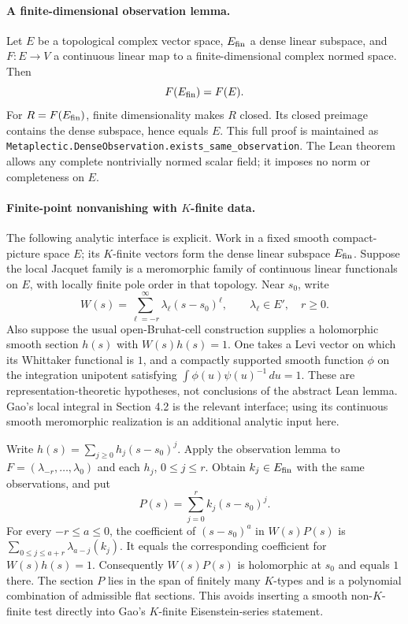 \paragraph{A finite-dimensional observation lemma.}
Let \(E\) be a topological complex vector space, \(E_{\rm fin}\)
a dense linear subspace, and \(F:E\to V\) a continuous linear map
to a finite-dimensional complex normed space. Then
\[
 F(E_{\rm fin})=F(E).
\]
For \(R=F(E_{\rm fin})\), finite dimensionality makes \(R\) closed.
Its closed preimage contains the dense subspace, hence equals \(E\).
This full proof is maintained as
\texttt{Metaplectic.DenseObservation.exists\_same\_observation}.
The Lean theorem allows any complete nontrivially normed scalar field;
it imposes no norm or completeness on \(E\).

\paragraph{Finite-point nonvanishing with \(K\)-finite data.}
The following analytic interface is explicit. Work in a fixed smooth
compact-picture space \(E\); its \(K\)-finite vectors form the dense
linear subspace \(E_{\rm fin}\). Suppose the local Jacquet family is
a meromorphic family of continuous linear functionals on \(E\), with
locally finite pole order in that topology. Near \(s_0\), write
\[
 W(s)=\sum_{\ell=-r}^{\infty}\lambda_\ell(s-s_0)^\ell,
 \qquad \lambda_\ell\in E',\quad r\ge0.
\]
Also suppose the usual open-Bruhat-cell construction supplies a
holomorphic smooth section \(h(s)\) with \(W(s)h(s)=1\).
One takes a Levi vector on which its Whittaker functional is \(1\),
and a compactly supported smooth function \(\phi\) on the integration
unipotent satisfying \(\int\phi(u)\psi(u)^{-1}\,du=1\).
These are representation-theoretic hypotheses, not conclusions of
the abstract Lean lemma. Gao's local integral in Section 4.2 is the
relevant interface; using its continuous smooth meromorphic realization
is an additional analytic input here.

Write \(h(s)=\sum_{j\ge0}h_j(s-s_0)^j\). Apply the observation lemma
to \(F=(\lambda_{-r},\ldots,\lambda_0)\) and each \(h_j\),
\(0\le j\le r\). Obtain \(k_j\in E_{\rm fin}\) with the same
observations, and put
\[
 P(s)=\sum_{j=0}^r k_j(s-s_0)^j.
\]
For every \(-r\le a\le0\), the coefficient of \((s-s_0)^a\)
in \(W(s)P(s)\) is
\(\sum_{0\le j\le a+r}\lambda_{a-j}(k_j)\).
It equals the corresponding coefficient for \(W(s)h(s)=1\).
Consequently \(W(s)P(s)\) is holomorphic at \(s_0\) and equals
\(1\) there. The section \(P\) lies in the span of finitely many
\(K\)-types and is a polynomial combination of admissible flat
sections. This avoids inserting a smooth non-\(K\)-finite test directly
into Gao's \(K\)-finite Eisenstein-series statement.

